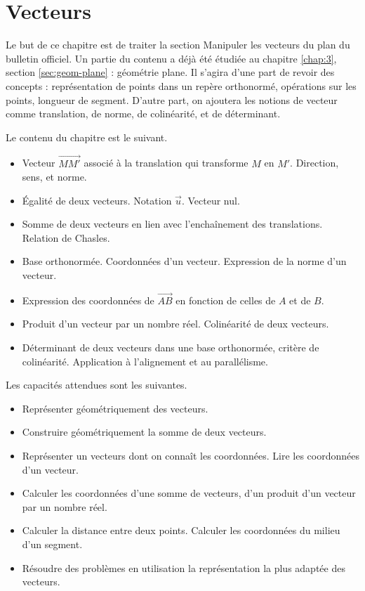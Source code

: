 
\chapter{Vecteurs}

Le but de ce chapitre est de traiter la section \og Manipuler les vecteurs du plan \fg du bulletin officiel.
Un partie du contenu a déjà été étudiée au chapitre \ref{chap:3}, section \ref{sec:geom-plane} : géométrie plane.
Il s'agira d'une part de revoir des concepts : représentation de points dans un repère orthonormé, opérations sur les points, longueur de segment.
D'autre part, on ajoutera les notions de vecteur comme translation, de norme, de colinéarité, et de déterminant.

Le contenu du chapitre est le suivant.
	\begin{itemize}
		\item
			Vecteur $\vec{MM'}$ associé à la translation qui transforme $M$ en $M'$. Direction, sens, et norme.
		\item
			Égalité de deux vecteurs. Notation $\vec{u}$. Vecteur nul.
		\item
			Somme de deux vecteurs en lien avec l'enchaînement des translations. Relation de Chasles.
		\item
			Base orthonormée. Coordonnées d'un vecteur. Expression de la norme d'un vecteur.
		\item
			Expression des coordonnées de $\vec{AB}$ en fonction de celles de $A$ et de $B$.
		\item
			Produit d'un vecteur par un nombre réel. Colinéarité de deux vecteurs.
		\item
			Déterminant de deux vecteurs dans une base orthonormée, critère de colinéarité.
			Application à l'alignement et au parallélisme.
	\end{itemize}

Les capacités attendues sont les suivantes.
	\begin{itemize}
		\item 
			Représenter géométriquement des vecteurs.
		\item
			Construire géométriquement la somme de deux vecteurs.
		\item
			Représenter un vecteurs dont on connaît les coordonnées.
			Lire les coordonnées d'un vecteur.
		\item
			Calculer les coordonnées d'une somme de vecteurs, d'un produit d'un vecteur par un nombre réel.
		\item
			Calculer la distance entre deux points. Calculer les coordonnées du milieu d'un segment.
		\item
			Résoudre des problèmes en utilisation la représentation la plus adaptée des vecteurs.
	\end{itemize}